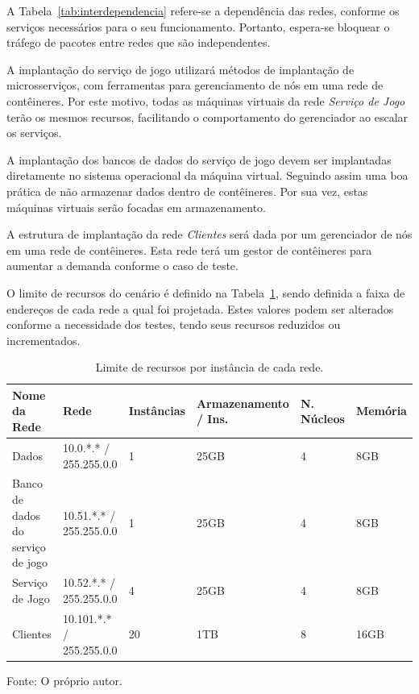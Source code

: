 A Tabela~\ref{tab:interdependencia} refere-se a dependência das redes, conforme os serviços necessários para o seu funcionamento.
%
Portanto, espera-se bloquear o tráfego de pacotes entre redes que são independentes.

A implantação do serviço de jogo utilizará métodos de implantação de microsserviços, com ferramentas para gerenciamento de nós em uma rede de contêineres.
%
Por este motivo, todas as máquinas virtuais da rede \textit{Serviço de Jogo} terão os mesmos recursos, facilitando o comportamento do gerenciador ao escalar os serviços.

A implantação dos bancos de dados do serviço de jogo devem ser implantadas diretamente no sistema operacional da máquina virtual.
%
Seguindo assim uma boa prática de não armazenar dados dentro de contêineres.
%
Por sua vez, estas máquinas virtuais serão focadas em armazenamento.

A estrutura de implantação da rede \textit{Clientes} será dada por um gerenciador de nós em uma rede de contêineres.
%
Esta rede terá um gestor de contêineres para aumentar a demanda conforme o caso de teste.

O limite de recursos do cenário é definido na Tabela~\ref{tab:limite_recursos}, sendo definida a faixa de endereços de cada rede a qual foi projetada.
%
Estes valores podem ser alterados conforme a necessidade dos testes, tendo seus recursos reduzidos ou incrementados.

\begin{table}[htb!]
\centering
\begin{adjustbox}{max width=\textwidth}
\caption{Limite de recursos por instância de cada rede.}
\label{tab:limite_recursos}
\begin{tabular}{l|l|l|l|l|l}
\hline \hline
Nome da Rede                      & Rede                     & Instâncias & Armazenamento / Ins. & N. Núcleos & Memória \\ \hline \hline
Dados                             & 10.0.*.* / 255.255.0.0   & 1          & 25GB                & 4          & 8GB     \\ \hline
Banco de dados do serviço de jogo & 10.51.*.* / 255.255.0.0  & 1          & 25GB                & 4          & 8GB     \\ \hline
Serviço de Jogo                   & 10.52.*.* / 255.255.0.0  & 4         & 25GB                 & 4          & 8GB     \\ \hline
Clientes                          & 10.101.*.* / 255.255.0.0 & 20          & 1TB                 & 8          & 16GB     \\ \hline \hline
\end{tabular}
\end{adjustbox}

Fonte: O próprio autor.
\end{table}

